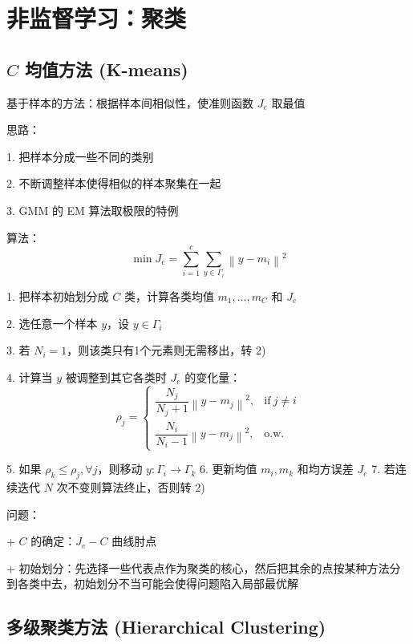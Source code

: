 \documentclass[openany]{ctexbook}
\theoremstyle{kaiti}
\theoremstyle{normal}
\begin{document}
\chapter{非监督学习：聚类}

\section{\texorpdfstring{$C$}{C} 均值方法 (K-means)}

基于样本的方法：根据样本间相似性，使准则函数 $J_e$ 取最值

思路：

1. 把样本分成一些不同的类别

2. 不断调整样本使得相似的样本聚集在一起

3. GMM 的 EM 算法取极限的特例

算法：
\begin{equation}
\min J_e=\sum_{i=1}^c{\sum_{y\in \Gamma_i}^{}{\left\| y-m_i \right\|^2}}
\end{equation}

1. 把样本初始划分成 $C$ 类，计算各类均值 $m_1,\dots ,m_C$ 和 $J_e$

2. 选任意一个样本 $y$，设 $y\in \Gamma_i$

3. 若 $N_i=1$，则该类只有1个元素则无需移出，转 2)

4. 计算当 $y$ 被调整到其它各类时 $J_e$ 的变化量：
\begin{equation}
  \rho_j=
  \begin{cases}
    \dfrac{N_j}{N_j+1}\left\| y-m_j \right\|^2, &\mathrm{if}~j\ne i\\
    \dfrac{N_i}{N_i-1}\left\| y-m_j \right\|^2, &\mathrm{o}.\mathrm{w}.
  \end{cases}
\end{equation}

5. 如果 $\rho_k\leqslant \rho_j, \forall j$，则移动 $y:\Gamma_i\rightarrow \Gamma_k$
6. 更新均值 $m_i, m_k$ 和均方误差 $J_e$
7. 若连续迭代 $N$ 次不变则算法终止，否则转 2)

问题：

+ $C$ 的确定：$J_e-C$ 曲线肘点

+ 初始划分：先选择一些代表点作为聚类的核心，然后把其余的点按某种方法分到各类中去，初始划分不当可能会使得问题陷入局部最优解

\section{多级聚类方法 (Hierarchical Clustering) }
\end{document}
